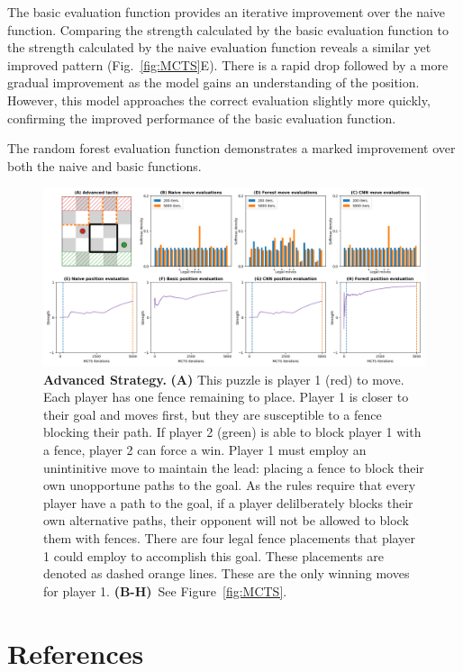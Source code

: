\documentclass[10pt]{article}
\begin{document}
The basic evaluation function provides an iterative improvement over the naive function. Comparing the strength calculated by the basic evaluation function to the strength calculated by the naive evaluation function reveals a similar yet improved pattern (Fig.~\ref{fig:MCTS}E). There is a rapid drop followed by a more gradual improvement as the model gains an understanding of the position. However, this model approaches the correct evaluation slightly more quickly, confirming the improved performance of the basic evaluation function. 

The random forest evaluation function demonstrates a marked improvement over both the naive and basic functions. 


\begin{figure}[H]
    \centering
    \includegraphics[width=\linewidth]{Adv_tactic.png}
    \caption{\textbf{Advanced Strategy.} \textbf{(A)} This puzzle is player 1 (red) to move. Each player has one fence remaining to place. Player 1 is closer to their goal and moves first, but they are susceptible to a fence blocking their path. If player 2 (green) is able to block player 1 with a fence, player 2 can force a win. Player 1 must employ an unintinitive move to maintain the lead: placing a fence to block their own unopportune paths to the goal. As the rules require that every player have a path to the goal, if a player delilberately blocks their own alternative paths, their opponent will not be allowed to block them with fences. There are four legal fence placements that player 1 could employ to accomplish this goal. These placements are denoted as dashed orange lines. These are the only winning moves for player 1. \textbf{(B-H)}~See Figure~\ref{fig:MCTS}.}
    \label{fig:AdvTactic}
\end{figure}

\section{References}

% 
% 
\end{document}
